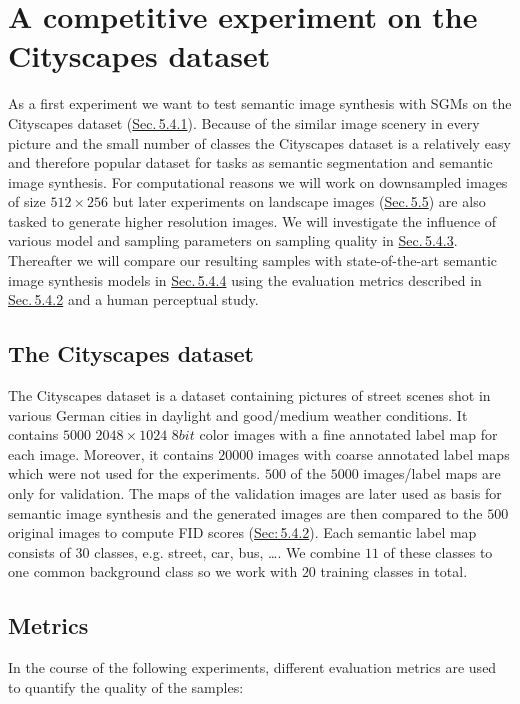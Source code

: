 
\section[A competitive experiment on the Cityscapes dataset]{A competitive experiment on the Cityscapes dataset%
    } \label{sec:5.4}
%
As a first experiment we want to test semantic image synthesis with SGMs on the Cityscapes dataset \cite{cityscapes} (\hyperref[sec:5.4.1]{Sec.\,5.4.1}). Because of the similar image scenery in every picture and the small number of classes the Cityscapes dataset is a relatively easy and therefore popular dataset for tasks as semantic segmentation and semantic image synthesis. For computational reasons we will work on downsampled images of size $512\times256$ but later experiments on landscape images (\hyperref[sec:5.5]{Sec.\,5.5}) are also tasked to generate higher resolution images. We will investigate the influence of various model and sampling parameters on sampling quality in \hyperref[sec:5.4.3]{Sec.\,5.4.3}. Thereafter we will compare our resulting samples with state-of-the-art semantic image synthesis models in \hyperref[sec:5.4.4]{Sec.\,5.4.4} using the evaluation metrics described in \hyperref[sec:5.4.2]{Sec.\,5.4.2} and a human perceptual study.

\subsection{The Cityscapes dataset}
The Cityscapes dataset \cite{cityscapes} is a dataset containing pictures of street scenes shot in various German cities in daylight and good/medium weather conditions. It contains $5000$ $2048\times1024$ $8bit$ color images with a fine annotated label map for each image. Moreover, it contains $20000$ images with coarse annotated label maps which were not used for the experiments. $500$ of the $5000$ images/label maps are only for validation. The maps of the validation images are later used as basis for semantic image synthesis and the generated images are then compared to the $500$ original images to compute FID scores (\hyperref[sec:fid]{Sec:\,5.4.2}). Each semantic label map consists of $30$ classes, e.g. street, car, bus, \dots. We combine $11$ of these classes to one common background class so we work with $20$ training classes in total.
%
\subsection{Metrics} \label{sec:5.4.2}
In the course of the following experiments, different evaluation metrics are used to quantify the quality of the samples:
%
